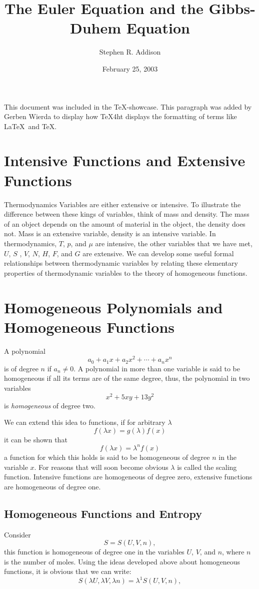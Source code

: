 \documentclass[12pt]{article}
\author{Stephen R. Addison}
\title{The Euler Equation and the Gibbs-Duhem Equation}
\date{February 25, 2003}
\begin{document}
\maketitle

\noindent This document was included in the \TeX-showcase. This paragraph was added by
Gerben Wierda to display how \TeX 4ht displays the formatting of terms like
\LaTeX\ and \TeX.

\section{Intensive Functions and Extensive Functions}
Thermodynamics Variables are either extensive or intensive.  To illustrate the difference between these kings of variables, think of mass and density.  The mass of an object depends on the amount of material in the object, the density does not.  Mass is an extensive variable, density is an intensive variable.  In thermodynamics, $T$, $p$, and $\mu$ are intensive, the other variables that we have met,  $U$, $S$ , $V$, $N$, $H$, $F$, and $G$ are extensive.  We can develop some useful formal relationships between thermodynamic variables by relating these elementary properties of thermodynamic variables to the theory of homogeneous functions.
\section{Homogeneous Polynomials and Homogeneous Functions}
A polynomial
\[
a_0+a_1x+a_2x^2+\cdots+a_nx^n
\]
is of degree $n$ if $a_n\neq0$.
A polynomial in more than one variable is said to be homogeneous if all its terms are of the same degree, thus, the polynomial in two variables
\[
x^2+5xy+13y^2
\]
is \emph{homogeneous} of degree two.

We can extend this idea to functions, if for arbitrary $\lambda$
\[
f(\lambda x)=g(\lambda)f(x)
\]
it can be shown that
\[
f(\lambda x)=\lambda^nf(x)
\]
a function for which this holds is said to be homogeneous of degree $n$ in the variable $x$.   For reasons that will soon become obvious $\lambda$ is called the scaling function.  Intensive functions are homogeneous of degree zero, extensive functions are homogeneous of degree one.
\subsection{Homogeneous Functions and Entropy}
Consider
\[
S=S(U,V,n),
\]
this function is homogeneous of degree one in the variables $U$, $V$, and $n$, where $n$ is the number of moles.  Using the ideas developed above about homogeneous functions, it is obvious that we can write:
\[
S(\lambda U,\lambda V, \lambda n)=\lambda^1S(U,V,n),
\]
 
\end{document}
